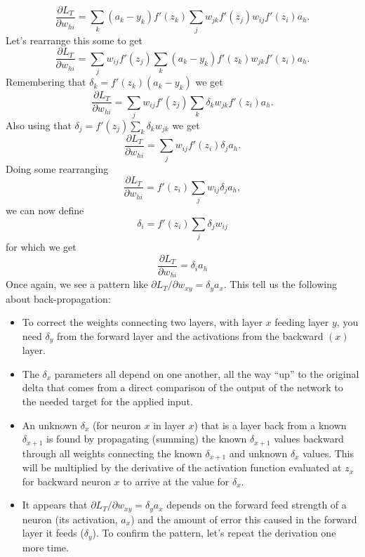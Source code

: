 \documentclass[12pt]{article}
\begin{document}
\begin{equation}
\frac{\partial L_T}{\partial w_{hi}}=\sum_k (a_k-y_k)f'(z_k)\sum_j w_{jk} f'(z_j) w_{ij} f'(z_i) a_h.
\end{equation}
Let's rearrange this some to get
\begin{equation}
\frac{\partial L_T}{\partial w_{hi}}=\sum_j w_{ij} f'(z_j)\sum_k (a_k-y_k)f'(z_k) w_{jk} f'(z_i) a_h.
\end{equation}
Remembering that $\delta_k=f'(z_k)(a_k-y_k)$ we get
\begin{equation}
\frac{\partial L_T}{\partial w_{hi}}=\sum_j w_{ij} f'(z_j)\sum_k\delta_k w_{jk} f'(z_i) a_h.
\end{equation}
Also using that $\delta_j=f'(z_j)\sum_k \delta_k w_{jk}$ we get
\begin{equation}
\frac{\partial L_T}{\partial w_{hi}}=\sum_j w_{ij} f'(z_i)\delta_j a_h.
\end{equation}
Doing some rearranging
\begin{equation}
\frac{\partial L_T}{\partial w_{hi}}=f'(z_i) \sum_j w_{ij}\delta_j a_h,
\end{equation}
we can now define
\begin{equation}
\delta_i=f'(z_i) \sum_j \delta_j w_{ij}
\end{equation}
for which we get
\begin{equation}
\frac{\partial L_T}{\partial w_{hi}}=\delta_i a_h
\label{dL_by_dwhi}
\end{equation}
Once again, we see a pattern like  ${\partial L_T}/{\partial w_{xy}}=\delta_ya_x$. This tell us the following about back-propagation:

\begin{itemize}
\item To correct the weights connecting two layers, with layer $x$ feeding layer $y$, you need $\delta_y$ from the forward layer and the activations from the backward $(x)$ layer.  

\item The $\delta_x$ parameters all depend on one another, all the way ``up'' to the original delta that comes from a direct comparison of the output of the network to the needed target for the applied input. 

\item An unknown $\delta_x$ (for neuron $x$ in layer $x$) that is a layer back from a known $\delta_{x+1}$ is found by propagating (summing) the known $\delta_{x+1}$ values backward through all weights connecting the known $\delta_{x+1}$ and unknown $\delta_x$ values. This will be multiplied by the derivative of the activation function evaluated at $z_x$ for backward neuron $x$ to arrive at the value for $\delta_x$.

\item  It appears that ${\partial L_T}/{\partial w_{xy}}=\delta_ya_x$ depends on the forward feed strength of a neuron (its activation, $a_x$) and the amount of error this caused in the forward layer it feeds ($\delta_y$).   To confirm the pattern, let's repeat the derivation one more time. 

\end{itemize}
\end{document}
